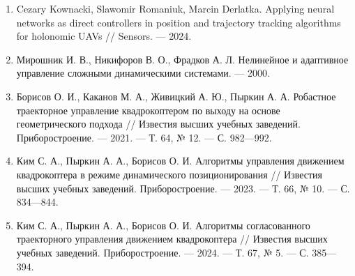 \begin{enumerate}
    \item Cezary Kownacki, Slawomir Romaniuk, Marcin Derlatka. Applying neural networks as direct controllers in position and trajectory tracking algorithms for holonomic UAVs //
    Sensors. — 2024.
    \item Мирошник И. В., Никифоров В. О., Фрадков А. Л. Нелинейное и адаптивное управление сложными динамическими системами. — 2000.
    \item Борисов О. И., Каканов М. А., Живицкий А. Ю., Пыркин А. А. Робастное траекторное управление квадрокоптером по выходу на основе геометрического подхода // Известия высших учебных заведений. Приборостроение. — 2021. — Т. 64, № 12. — С. 982—992.
    \item Ким С. А., Пыркин А. А., Борисов О. И. Алгоритмы управления движением квадрокоптера в режиме динамического позиционирования // Известия высших учебных заведений. Приборостроение. — 2023. — Т. 66, № 10. — С. 834—844.
    \item Ким С. А., Пыркин А. А., Борисов О. И. Алгоритмы согласованного траекторного управления движением квадрокоптера // Известия высших учебных заведений. Приборостроение. — 2024. — Т. 67, № 5. — С. 385—394.


\end{enumerate}